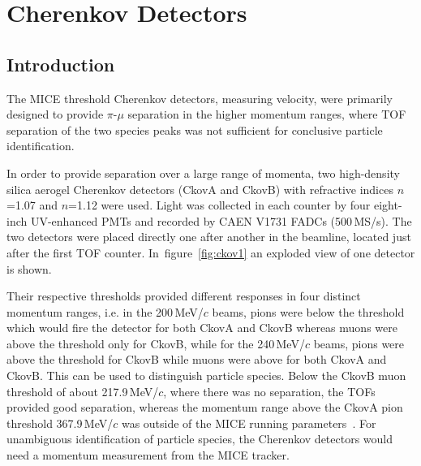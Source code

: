 \graphicspath{{03-Ckov/Figures/}}

\section{Cherenkov Detectors}
\label{Sect:Ckov}

\subsection{Introduction}
\label{SubSect:Ckov_Intro}

The MICE threshold Cherenkov detectors, measuring velocity, were primarily designed to provide $\pi$-$\mu$ separation in the higher momentum ranges, where TOF separation of the two species peaks was not sufficient for conclusive particle identification.

In order to provide separation over a large range of momenta, two high-density silica aerogel Cherenkov detectors (CkovA and CkovB) with refractive indices $n$=1.07 and $n$=1.12 were used.
Light was collected in each counter by four eight-inch UV-enhanced PMTs and recorded by CAEN V1731 FADCs (500\,MS/s).
The two detectors were placed directly one after another in the beamline, located just after the first TOF counter. In~figure~\ref{fig:ckov1} an exploded view of one detector is shown.

Their respective thresholds provided different responses in four distinct momentum ranges, i.e. in the 200\,MeV/$c$ beams, pions were below the threshold which would fire the detector for both CkovA and CkovB whereas muons were above the threshold only for CkovB, while for the 240\,MeV/$c$ beams, pions were above the threshold for CkovB while muons were above for both CkovA and CkovB.
This can be used to distinguish particle species.
Below the CkovB muon threshold of about 217.9\,MeV/$c$, where there was no separation, the TOFs provided good separation, whereas the momentum range above the CkovA pion threshold 367.9\,MeV/$c$ was outside of the MICE running parameters~\cite{NOTE473}.
For unambiguous identification of particle species, the Cherenkov detectors would need a momentum measurement from the MICE tracker.

